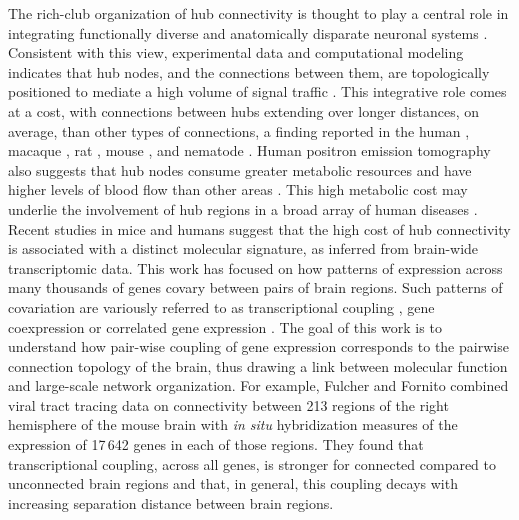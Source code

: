 \documentclass[10pt,letterpaper]{article}
\begin{document}
The rich-club organization of hub connectivity is thought to play a central role in integrating functionally diverse and anatomically disparate neuronal systems \cite{Fornito2015, vandenHeuvel:2013ij, ZamoraLopez:2010hy, Crossley2014, Crossley:2013kl}.
Consistent with this view, experimental data and computational modeling indicates that hub nodes, and the connections between them, are topologically positioned to mediate a high volume of signal traffic \cite{vandenHeuvel:2012kh, Harriger2012, Misic:2014it, Misic:2015jw}.
This integrative role comes at a cost, with connections between hubs extending over longer distances, on average, than other types of connections, a finding reported in the human \cite{vandenHeuvel:2012kh}, macaque \cite{Harriger2012}, rat \cite{VandenHeuvel2016b}, mouse \cite{Fulcher:2016ck}, and nematode \cite{Towlson2013}.
Human positron emission tomography also suggests that hub nodes consume greater metabolic resources and have higher levels of blood flow than other areas \cite{Tomasi:2013kl, Collin:2014kq, Liang2013a}.
This high metabolic cost may underlie the involvement of hub regions in a broad array of human diseases \cite{Fornito2015, Bullmore:2012vl, Crossley2014}. \\ %
Recent studies in mice and humans suggest that the high cost of hub connectivity is associated with a distinct
\color{teal}
molecular signature, as inferred from brain-wide transcriptomic data. This work has focused on how patterns of expression across many thousands of genes covary between pairs of brain regions.
Such patterns of covariation are variously referred to as transcriptional coupling \cite{Fulcher:2016ck}, gene coexpression \cite{Krienen:2016eq} or correlated gene expression \cite{Richiardi2015, Mills2017, Goel2014}.
The goal of this work is to understand how pair-wise coupling of gene expression corresponds to the pairwise connection topology of the brain, thus drawing a link between molecular function and large-scale network organization.
For example,
\color{black}
Fulcher and Fornito \cite{Fulcher:2016ck} combined viral tract tracing data on connectivity between 213 regions of the right hemisphere of the mouse brain \cite{Oh2014} with \emph{in situ} hybridization measures of the expression of 17\,642 genes in each of those regions.
They found that transcriptional coupling, across all genes, is stronger for connected compared to unconnected brain regions and that, in general, this coupling decays with increasing separation distance between brain regions.
\end{document}
